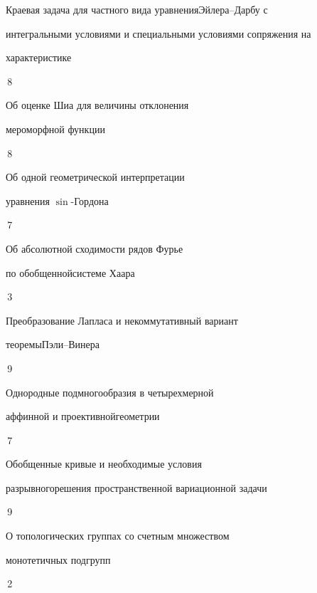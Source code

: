 

{Краевая задача для частного вида уравнения\newline Эйлера--Дарбу с 


интегральными условиями и специальными условиями сопряжения на \newline


характеристике}{\No\,8}




{Об оценке Шиа для величины отклонения


мероморфной функции}{\No\,8}




{Об одной геометрической интерпретации 


уравнения $\sin$-Гордона}{\No\,7}




{Об абсолютной сходимости рядов Фурье 


по обобщенной\newline системе Хаара}{\No\,3}




{Преобразование Лапласа и некоммутативный вариант


теоремы\newline Пэли--Винера}{\No\,9}




{Однородные подмногообразия в четырехмерной 


аффинной и проективной\newline геометрии}{\No\,7}




{Обобщенные кривые и необходимые условия  


разрывного\newline решения пространственной вариационной задачи}{\No\,9}






{О топологических группах со счетным множеством 


монотетичных подгрупп}{\No\,2}


